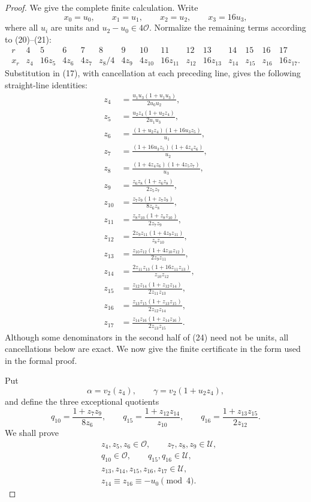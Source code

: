\documentclass[11pt]{article}
\theoremstyle{remark}
\newcommand{\Ot}{\mathcal O}
\newcommand{\Ut}{\mathcal U}
\newcommand{\vt}{v_2}
\begin{document}
\begin{proof}
We give the complete finite calculation.  Write
\[
 x_0=u_0,\qquad x_1=u_1,\qquad x_2=u_2,\qquad x_3=16u_3,          \tag{22}
\]
where all $u_i$ are units and $u_2-u_0\in4\Ot$.  Normalize the
remaining terms according to (20)--(21):
\[
\begin{array}{c|cccccccccccccc}
r&4&5&6&7&8&9&10&11&12&13&14&15&16&17\\ \hline
x_r
&z_4&16z_5&4z_6&4z_7&z_8/4&4z_9&4z_{10}&16z_{11}
&z_{12}&16z_{13}&z_{14}&z_{15}&z_{16}&16z_{17}.
\end{array}                                                       \tag{23}
\]
Substitution in (17), with cancellation at each preceding line, gives the
following straight-line identities:
\[
\begin{aligned}
z_4&=\frac{u_1u_3(1+u_1u_3)}{2u_0u_2},\\
z_5&=\frac{u_2z_4(1+u_2z_4)}{2u_1u_3},\\
z_6&=\frac{(1+u_2z_4)(1+16u_3z_5)}{u_1},\\
z_7&=\frac{(1+16u_3z_5)(1+4z_4z_6)}{u_2},\\
z_8&=\frac{(1+4z_4z_6)(1+4z_5z_7)}{u_3},\\
z_9&=\frac{z_6z_8(1+z_6z_8)}{2z_5z_7},\\
z_{10}&=\frac{z_7z_9(1+z_7z_9)}{8z_6z_8},\\
z_{11}&=\frac{z_8z_{10}(1+z_8z_{10})}{2z_7z_9},\\
z_{12}&=\frac{2z_9z_{11}(1+4z_9z_{11})}{z_8z_{10}},\\
z_{13}&=\frac{z_{10}z_{12}(1+4z_{10}z_{12})}{2z_9z_{11}},\\
z_{14}&=\frac{2z_{11}z_{13}(1+16z_{11}z_{13})}{z_{10}z_{12}},\\
z_{15}&=\frac{z_{12}z_{14}(1+z_{12}z_{14})}{2z_{11}z_{13}},\\
z_{16}&=\frac{z_{13}z_{15}(1+z_{13}z_{15})}{2z_{12}z_{14}},\\
z_{17}&=\frac{z_{14}z_{16}(1+z_{14}z_{16})}{2z_{13}z_{15}}.
                                                                    \tag{24}
\end{aligned}
\]
Although some denominators in the second half of (24) need not be units,
all cancellations below are exact.  We now give the finite certificate in
the form used in the formal proof.

Put
\[
 \alpha=\vt(z_4),\qquad \gamma=\vt(1+u_2z_4),
\]
and define the three exceptional quotients
\[
 q_{10}=\frac{1+z_7z_9}{8z_6},\qquad
 q_{15}=\frac{1+z_{12}z_{14}}{z_{10}},\qquad
 q_{16}=\frac{1+z_{13}z_{15}}{2z_{12}}.                         \tag{25}
\]
We shall prove
\[
\begin{aligned}
 &z_4,z_5,z_6\in\Ot,\qquad z_7,z_8,z_9\in\Ut,\\
 &q_{10}\in\Ot,\qquad q_{15},q_{16}\in\Ut,\\
 &z_{13},z_{14},z_{15},z_{16},z_{17}\in\Ut,\\
 &z_{14}\equiv z_{16}\equiv-u_0\pmod4.                          \tag{26}
\end{aligned}
\]


\end{proof}
\end{document}
